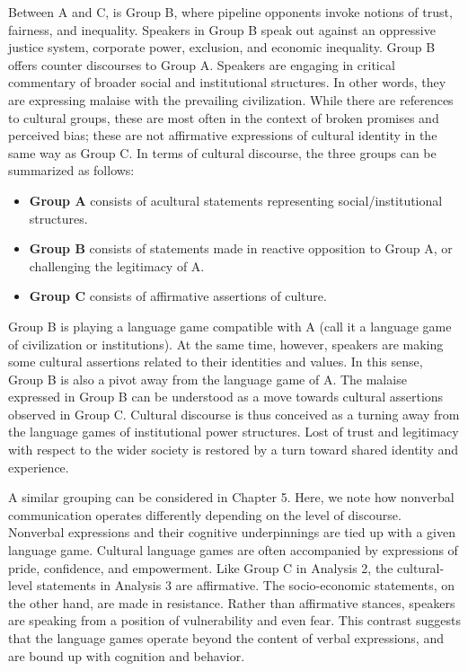 Between A and C, is Group B, where pipeline opponents invoke notions of trust, fairness, and inequality. Speakers in Group B speak out against an oppressive justice system, corporate power, exclusion, and economic inequality. Group B offers counter discourses to Group A. Speakers are engaging in critical commentary of broader social and institutional structures. In other words, they are expressing malaise with the prevailing civilization. While there are references to cultural groups, these are most often in the context of broken promises and perceived bias; these are not affirmative expressions of cultural identity in the same way as Group C. In terms of cultural discourse, the three groups can be summarized as follows: 

\begin{itemize}
  \item \textbf{Group A} consists of acultural statements representing social/institutional structures.
  \item \textbf{Group B} consists of statements made in reactive opposition to Group A, or challenging the legitimacy of A.
  \item \textbf{Group C} consists of affirmative assertions of culture.
\end{itemize} 
  
Group B is playing a language game compatible with A (call it a language game of civilization or institutions). At the same time, however, speakers are making some cultural assertions related to their identities and values. In this sense, Group B is also a pivot away from the language game of A. The malaise expressed in Group B can be understood as a move towards cultural assertions observed in Group C. Cultural discourse is thus conceived as a turning away from the language games of institutional power structures. Lost of trust and legitimacy with respect to the wider society is restored by a turn toward shared identity and experience.  
 
A similar grouping can be considered in Chapter 5. Here, we note how nonverbal communication operates differently depending on the level of discourse. Nonverbal expressions and their cognitive underpinnings are tied up with a given language game. Cultural language games are often accompanied by expressions of pride, confidence, and empowerment. Like Group C in Analysis 2, the cultural-level statements in Analysis 3 are affirmative. The socio-economic statements, on the other hand, are made in resistance. Rather than affirmative stances, speakers are speaking from a position of vulnerability and even fear. This contrast suggests that the language games operate beyond the content of verbal expressions, and are bound up with cognition and behavior.    
 

